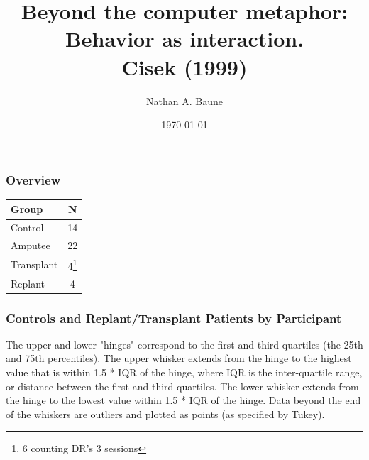 \documentclass{beamer}
\title[Cisek (1999)]{Beyond the computer metaphor:\\ Behavior as interaction.\\Cisek (1999)} %
\author{Nathan A. Baune} %
\institute[UM] %
{
  University of Missouri-Columbia   \\   %
  \medskip
   \textit{} %
}
\date{\today} %
\begin{document}



\section{}

\begin{frame}
\frametitle{Overview}
\begin{tabular}{lc}
Group& N\\
\hline
Control&14\\
Amputee&22\\
Transplant&4\footnote{6 counting DR's 3 sessions}\\
Replant&4\\
\hline
\end{tabular}
\end{frame}


\begin{frame}
\frametitle{Controls and Replant/Transplant Patients by Participant}
\begin{figure}
\setlength{\fboxsep}{0pt}%
\setlength{\fboxrule}{1pt}%
\end{figure}
\tiny
The upper and lower "hinges" correspond to the first and third quartiles (the 25th and 75th percentiles). The upper whisker extends from the hinge to the highest value that is within 1.5 * IQR of the hinge, where IQR is the inter-quartile range, or distance between the first and third quartiles. The lower whisker extends from the hinge to the lowest value within 1.5 * IQR of the hinge. Data beyond the end of the whiskers are outliers and plotted as points (as specified by Tukey).
\end{frame}
\end{document}
